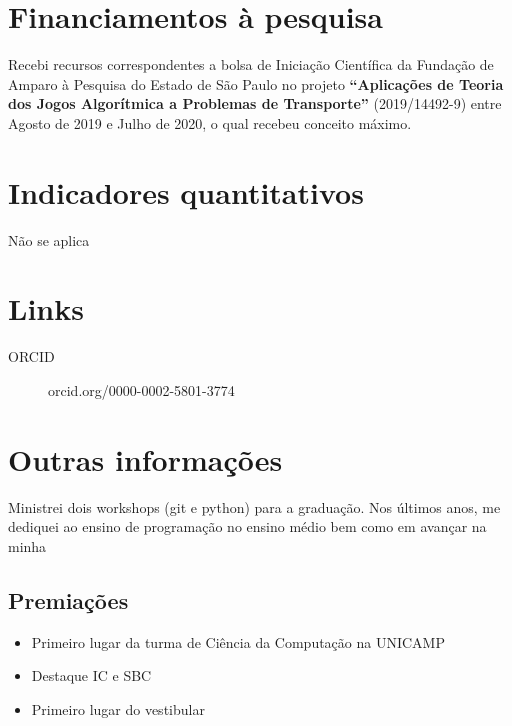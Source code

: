 \documentclass[11pt]{article}
\begin{document}
\section*{Financiamentos à pesquisa}
\label{sec:orgfc8c3da}
Recebi recursos correspondentes a bolsa de Iniciação Científica da Fundação de Amparo à Pesquisa do Estado de São Paulo no projeto \textbf{``Aplicações de Teoria dos Jogos Algorítmica a Problemas de Transporte''} (2019/14492-9) entre Agosto de 2019 e Julho de 2020, o qual recebeu conceito máximo.
\section*{Indicadores quantitativos}
\label{sec:org2d4513a}
Não se aplica
\section*{Links}
\label{sec:orgb9f7298}
\begin{description}
\item[{ORCID}] orcid.org/0000-0002-5801-3774
\end{description}
\section*{Outras informações}
\label{sec:org18eea9a}
Ministrei dois workshops (git e python) para a graduação.
Nos últimos anos, me dediquei ao ensino de programação no ensino médio bem como em avançar na minha
\subsection*{Premiações}
\label{sec:org3a79809}
\begin{itemize}
\item Primeiro lugar da turma de Ciência da Computação na UNICAMP
\item Destaque IC e SBC
\item Primeiro lugar do vestibular
\end{itemize}
\end{document}
